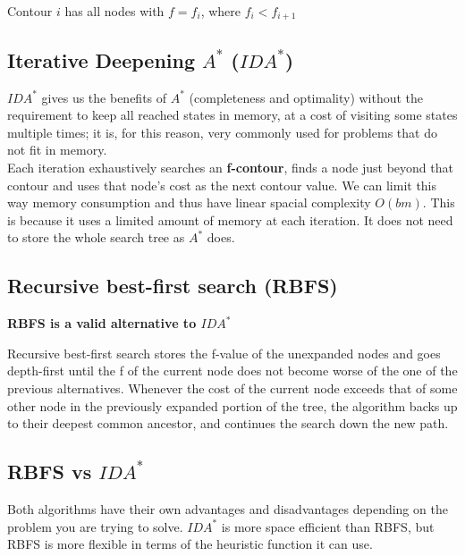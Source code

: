 \documentclass{article}
\begin{document}
\begin{center}
    Contour $i$ has all nodes with $f = f_i$, where $f_i < f_{i+1}$
\end{center}

\subsection{Iterative Deepening $A^*$ ($IDA^*$)}

$IDA^*$ gives us the benefits of $A^*$ (completeness and optimality) without the requirement to keep all reached states in memory, at a cost of visiting some states multiple times; it is, for this reason, very commonly used for problems that do not fit in memory. \\

Each iteration exhaustively searches an \textbf{f-contour}, finds a node just beyond that contour and uses that node's cost as the next contour value. We can limit this way memory consumption and thus have linear spacial complexity $O(bm)$. This is because it uses a limited amount of memory at each iteration. It does not need to store the whole search tree as $A^*$ does.

\newpage

\subsection{Recursive best-first search (RBFS)}

\textbf{RBFS is a valid alternative to $IDA^*$}

Recursive best-first search stores the f-value of the unexpanded nodes and goes depth-first until the f of the current node does not become worse of the one of the previous alternatives. Whenever the cost of the current node exceeds that of some other node in the previously expanded portion of the tree, the algorithm backs up to their deepest common ancestor, and continues the search down the new path. \\

\subsection{RBFS vs $IDA^*$}

Both algorithms have their own advantages and disadvantages depending on the problem you are trying to solve. $IDA^*$ is more space efficient than RBFS, but RBFS is more flexible in terms of the heuristic function it can use. \\
\end{document}
